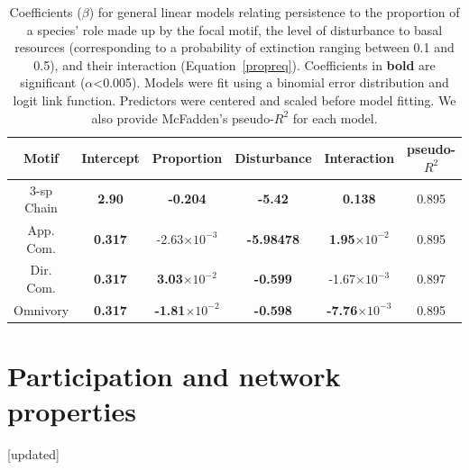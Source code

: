 \documentclass[12pt]{article}
\begin{document}
\begin{spacing}{2.0}
    \begin{table}[ht!]
        \centering
        \caption{Coefficients ($\beta$) for general linear models relating persistence to the proportion of a species' role made up by the focal motif, the level of disturbance to basal resources (corresponding to a probability of extinction ranging between 0.1 and 0.5), and their interaction  (Equation~\ref{propreq}). Coefficients in \textbf{bold} are significant ($\alpha$\textless0.005). Models were fit using a binomial error distribution and logit link function. Predictors were centered and scaled before model fitting. We also provide McFadden's pseudo-$R^2$ for each model.}
        \label{tab:proportion}                \footnotesize
        \begin{tabular}{c|c c c c | c }
        Motif & Intercept & Proportion & Disturbance & Interaction & pseudo-$R^2$  \\
        \hline
        3-sp Chain & \textbf{2.90} & \textbf{-0.204} & \textbf{-5.42} & \textbf{0.138} & 0.895 \\
        App. Com. & \textbf{0.317} & -2.63$\times10^{-3}$ & \textbf{-5.98478} & \textbf{1.95$\times10^{-2}$} & 0.895 \\
        Dir. Com. & \textbf{0.317} & \textbf{3.03$\times10^{-2}$} & \textbf{-0.599} & -1.67$\times10^{-3}$ &  0.897 \\
        Omnivory & \textbf{0.317} & \textbf{-1.81$\times10^{-2}$} & \textbf{-0.598} & \textbf{-7.76$\times10^{-3}$} & 0.895 \\
        \end{tabular}
    \end{table}        
\clearpage     

\section{Participation and network properties} [updated]


\end{spacing}
\end{document}
